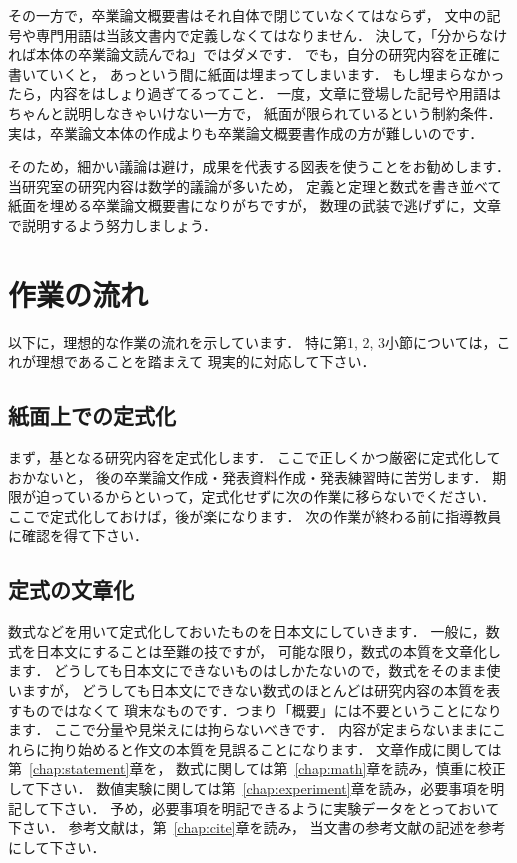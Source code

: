 \documentclass[a4j,12pt,dvipdfmx,oneside]{jsbook}
\theoremstyle{definition}
\begin{document}
その一方で，卒業論文概要書はそれ自体で閉じていなくてはならず，
文中の記号や専門用語は当該文書内で定義しなくてはなりません．
決して，「分からなければ本体の卒業論文読んでね」ではダメです．
でも，自分の研究内容を正確に書いていくと，
あっという間に紙面は埋まってしまいます．
もし埋まらなかったら，内容をはしょり過ぎてるってこと．
一度，文章に登場した記号や用語はちゃんと説明しなきゃいけない一方で，
紙面が限られているという制約条件．
実は，卒業論文本体の作成よりも卒業論文概要書作成の方が難しいのです．

そのため，細かい議論は避け，成果を代表する図表を使うことをお勧めします．
当研究室の研究内容は数学的議論が多いため，
定義と定理と数式を書き並べて紙面を埋める卒業論文概要書になりがちですが，
数理の武装で逃げずに，文章で説明するよう努力しましょう．
%
%
%
\section{作業の流れ}\label{sec:abst_flow}
%
%
%
以下に，理想的な作業の流れを示しています．
特に第1, 2, 3小節については，これが理想であることを踏まえて
現実的に対応して下さい．
\subsection{紙面上での定式化}
まず，基となる研究内容を定式化します．
ここで正しくかつ厳密に定式化しておかないと，
後の卒業論文作成・発表資料作成・発表練習時に苦労します．
期限が迫っているからといって，定式化せずに次の作業に移らないでください．
ここで定式化しておけば，後が楽になります．
次の作業が終わる前に指導教員に確認を得て下さい．
%
%
%
\subsection{定式の文章化}
%
%
%
数式などを用いて定式化しておいたものを日本文にしていきます．
一般に，数式を日本文にすることは至難の技ですが，
可能な限り，数式の本質を文章化します．
どうしても日本文にできないものはしかたないので，数式をそのまま使いますが，
どうしても日本文にできない数式のほとんどは研究内容の本質を表すものではなくて
瑣末なものです．つまり「概要」には不要ということになります．
ここで分量や見栄えには拘らないべきです．
内容が定まらないままにこれらに拘り始めると作文の本質を見誤ることになります．
文章作成に関しては第~\ref{chap:statement}章を，
数式に関しては第~\ref{chap:math}章を読み，慎重に校正して下さい．
数値実験に関しては第~\ref{chap:experiment}章を読み，必要事項を明記して下さい．
予め，必要事項を明記できるように実験データをとっておいて下さい．
参考文献は，第~\ref{chap:cite}章を読み，
当文書の参考文献の記述を参考にして下さい．
%
%
%
%
\end{document}
